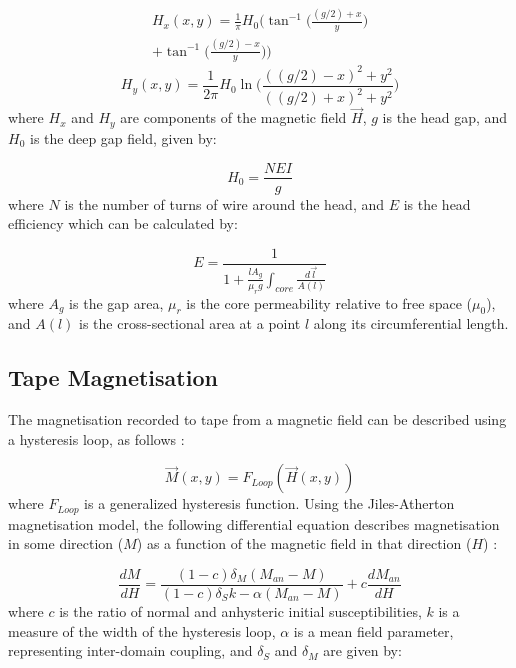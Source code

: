 \documentclass[twoside,a4paper]{article}
\begin{document}
\begin{multline}
    H_x(x,y) = \frac{1}{\pi} H_0 \Big(\tan^{-1} \Big(\frac{(g/2) + x}{y} \Big) \\
    + \tan^{-1} \Big(\frac{(g/2) - x}{y} \Big) \Big)
    \label{eq:H_x}
\end{multline}
\begin{equation}
    H_y(x,y) = \frac{1}{2 \pi} H_0 \ln \Big(\frac{((g/2) - x)^2 + y^2}{((g/2) + x)^2 + y^2} \Big)
    \label{eq:H_y}
\end{equation}
%
where $H_x$ and $H_y$ are components of the magnetic field $\vec{H}$,
$g$ is the head gap, and $H_0$ is the deep gap field, given by:

\begin{equation}
    H_0 = \frac{NEI}{g}
\end{equation}
%
where $N$ is the number of turns of wire around the head, and $E$ is the head 
efficiency which can be calculated by:

\begin{equation}
    E = \frac{1}{1 + \frac{l  A_g}{\mu_r g} \int_{core} \frac {d \vec{l}}{A(l)}}
\end{equation}
%
where $A_g$ is the gap area, $\mu_r$ is the core permeability relative to 
free space ($\mu_0$), and $A(l)$ is the cross-sectional 
area at a point $l$ along its circumferential length.

\subsection{Tape Magnetisation}
The magnetisation recorded to tape from a magnetic field can be described
using a hysteresis loop, as follows \cite{1994tmr..book.....B}:

\begin{equation}
    \vec{M}(x,y) = F_{Loop}(\vec{H}(x,y))
\end{equation}
%
where $F_{Loop}$ is a generalized hysteresis function.
\newline\newline
Using the Jiles-Atherton magnetisation model, the following
differential equation describes magnetisation in some direction ($M$)
as a function of the magnetic field in that direction ($H$) \cite{Hysteresis}:

\begin{equation}
    \frac{dM}{dH} = \frac{(1-c) \delta_M (M_{an} - M)}{(1-c) \delta_S k - \alpha (M_{an} - M)} + c \frac{dM_{an}}{dH}
    \label{eq5}
\end{equation}
%
where $c$ is the ratio of normal and anhysteric initial susceptibilities,
$k$ is a measure of the width of the hysteresis
loop, $\alpha$ is a mean field parameter, representing inter-domain
coupling, and $\delta_S$ and $\delta_M$ are given by:
\end{document}
